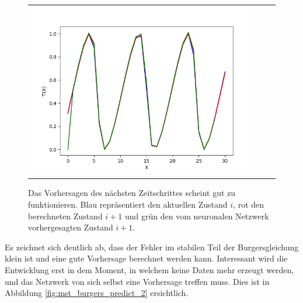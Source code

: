 \begin{figure}
\begin{tabular}{ccc}
		\includegraphics[scale=0.27]{learning/img/burger_predict20.png}
	\end{tabular}
	\label{fig:mst_burgers_predict_1}
	\caption{Das Vorhersagen des nächsten Zeitschrittes scheint gut zu funktionieren. Blau repräsentiert den aktuellen Zustand $i$, rot den berechneten Zustand $i+1$ und grün den vom neuronalen Netzwerk vorhergesagten Zustand $i+1$. }
\end{figure}

Es zeichnet sich deutlich ab, dass der Fehler im stabilen Teil der Burgersgleichung klein ist und eine gute Vorhersage berechnet werden kann. Interessant wird die Entwicklung erst in dem Moment, in welchem keine Daten mehr erzeugt werden, und das Netzwerk von sich selbst eine Vorhersage treffen muss. Dies ist in Abbildung \ref{fig:mst_burgers_predict_2} ersichtlich.

